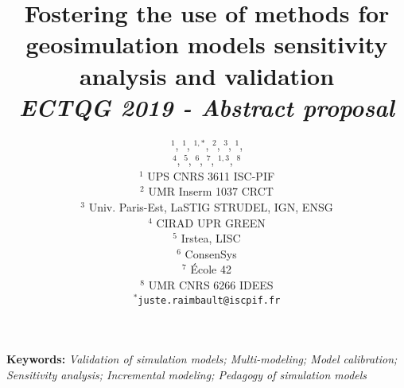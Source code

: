 \documentclass[11pt]{article}
\begin{document}
\title{\vspace{-1cm}Fostering the use of methods for geosimulation models sensitivity analysis and validation
\\\medskip
\textit{ECTQG 2019 - Abstract proposal}
}
\author{$^{1}$, $^{1}$, $^{1,\ast}$, $^2$, $^3$, $^1$,\\
 $^4$, $^5$, $^6$, $^7$, $^{1,3}$, $^8$\medskip\\
$^1$ UPS CNRS 3611 ISC-PIF\\
$^2$ UMR Inserm 1037 CRCT\\
$^3$ Univ. Paris-Est, LaSTIG STRUDEL, IGN, ENSG\\
$^4$ CIRAD UPR GREEN\\%
$^5$ Irstea, LISC \\
$^6$ ConsenSys\\
$^7$ {\'E}cole 42\\
$^8$ UMR CNRS 6266 IDEES
\medskip\\
$^{\ast}$\texttt{juste.raimbault@iscpif.fr}
}
\date{}

\maketitle

\justify



\textbf{Keywords: }\textit{Validation of simulation models; Multi-modeling; Model calibration; Sensitivity analysis; Incremental modeling; Pedagogy of simulation models}

\medskip
\end{document}
